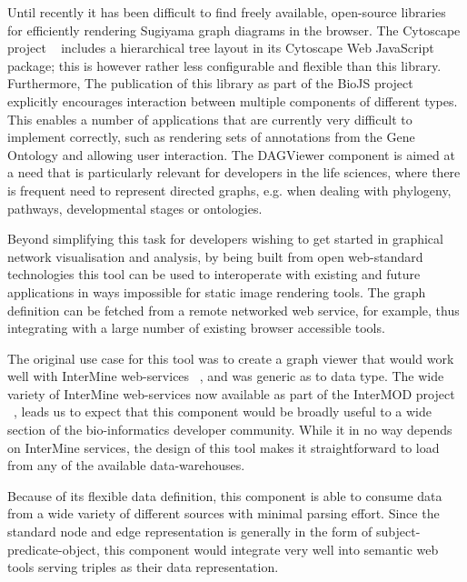 \documentclass[10pt,a4paper,twocolumn]{article}
\begin{document}
Until recently it has been difficult to find freely available, open-source
libraries for efficiently rendering Sugiyama graph diagrams in the browser. The
Cytoscape project ~\cite{cytoscape} includes a hierarchical tree layout in its
Cytoscape Web JavaScript package; this is however rather less configurable and
flexible than this library. Furthermore, The publication of this library as part
of the BioJS project explicitly encourages interaction between multiple
components of different types. This enables a number of applications that are
currently very difficult to implement correctly, such as rendering sets of
annotations from the Gene Ontology and allowing user interaction. The DAGViewer
component is aimed at a need that is particularly relevant for developers in the
life sciences, where there is frequent need to represent directed graphs, e.g.
when dealing with phylogeny, pathways, developmental stages or ontologies.

Beyond simplifying this task for developers wishing to get started in graphical
network visualisation and analysis, by being built from open web-standard
technologies this tool can be used to interoperate with existing and future
applications in ways impossible for static image rendering tools. The graph
definition can be fetched from a remote networked web service, for example, thus
integrating with a large number of existing browser accessible tools.

The original use case for this tool was to create a graph viewer that would work
well with InterMine web-services ~\cite{intermine}, and was generic as to
data type.  The wide variety of InterMine web-services now available as part of
the InterMOD project ~\cite{intermod}, leads us to expect that this component
would be broadly useful to a wide section of the bio-informatics developer
community.  While it in no way depends on InterMine services, the design of this
tool makes it straightforward to load from any of the available data-warehouses.

Because of its flexible data definition, this component is able to consume data
from a wide variety of different sources with minimal parsing effort. Since the
standard node and edge representation is generally in the form of
subject-predicate-object, this component would integrate very well into semantic
web tools serving triples as their data representation.
\end{document}
